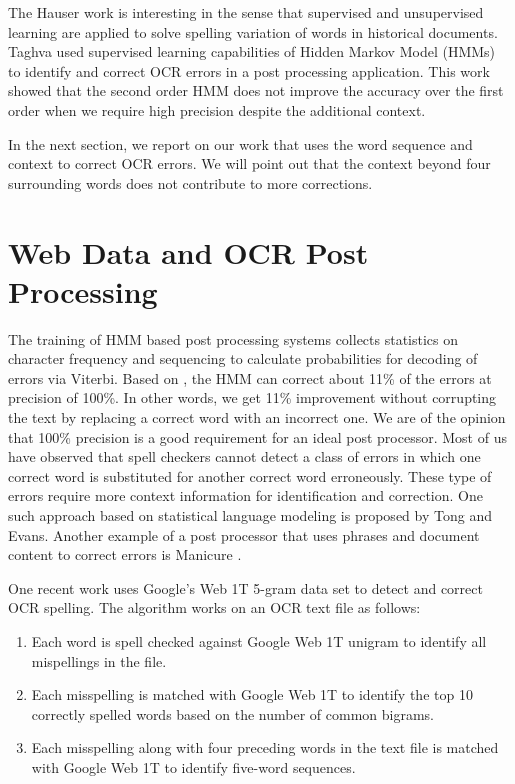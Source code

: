 \documentclass{article}
\begin{document}
The Hauser\cite{Hauser} work is interesting in the sense that
supervised and unsupervised learning are applied to solve spelling
variation of words in historical documents. Taghva \cite{Taghva2013}
used supervised learning capabilities of Hidden Markov Model (HMMs) to
identify and correct OCR errors in a post processing application. This
work showed that the second order HMM does not improve the accuracy
over the first order when we require high precision despite the
additional context.

In the next section, we report on our work that uses the word sequence
and context to correct OCR errors. We will point out that the context
beyond four surrounding words does not contribute to more corrections.

\section{Web Data and OCR Post Processing}
\label{sec:web}
The training of HMM based post processing systems collects statistics
on character frequency and sequencing to calculate probabilities for
decoding of errors via Viterbi. Based on \cite{Taghva2013}, the HMM
can correct about 11\% of the errors at precision of 100\%. In other
words, we get 11\% improvement without corrupting the text by
replacing a correct word with an incorrect one. We are of the opinion
that 100\% precision is a good requirement for an ideal post
processor. Most of us have observed that spell checkers cannot detect
a class of errors in which one correct word is substituted for another
correct word erroneously. These type of errors require more context
information for identification and correction. One such approach based
on statistical language modeling is proposed by Tong and
Evans\cite{Tong96}. Another example of a post processor that uses
phrases and document content to correct errors is Manicure
\cite{Taghva98}.

One recent work \cite{Bassil2012, Bassil2012b} uses Google’s Web 1T
5-gram data set to detect and correct OCR spelling. The algorithm
works on an OCR text file as follows:

\begin{enumerate}

\item Each word is spell checked against Google Web 1T unigram to
  identify all mispellings in the file.\\

\item Each misspelling is matched with Google Web 1T to identify the
  top 10 correctly spelled words based on the number of common bigrams.\\

\item Each misspelling along with four preceding words in the text
  file is matched with Google Web 1T to identify five-word
  sequences.\\

\end{enumerate}
\end{document}
